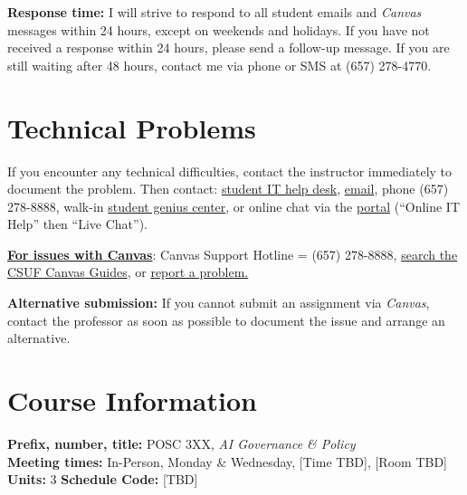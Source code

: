 \documentclass[12pt]{article}
\begin{document}
\vspace{0.5em}
\noindent \textbf{Response time:} I will strive to respond to all student emails and \emph{Canvas} messages within 24 hours, except on weekends and holidays. If you have not received a response within 24 hours, please send a follow-up message. If you are still waiting after 48 hours, contact me via phone or SMS at (657) 278-4770.

\section*{Technical Problems}

If you encounter any technical difficulties, contact the instructor immediately to document the problem. Then contact: \href{http://www.fullerton.edu/it/students/helpdesk/index.php}{student IT help desk}, \href{mailto:StudentITHelpDesk@fullerton.edu}{email}, phone (657) 278-8888, walk-in \href{http://www.fullerton.edu/it/students/sgc/index.php}{student genius center}, or online chat via the \href{http://my.fullerton.edu}{portal} (``Online IT Help'' then ``Live Chat'').

\vspace{0.5em}
\noindent \textbf{\underline{For issues with Canvas}}: Canvas Support Hotline = (657) 278-8888, \href{https://canvashelp.fullerton.edu/}{search the CSUF Canvas Guides}, or \href{https://titans.service-now.com/sp?id=sc_cat_item&sys_id=f88efe80ebea6a10fb7cfcffcad0cdc6&subject=Canvas}{report a problem.}

\vspace{0.5em}
\noindent \textbf{Alternative submission:} If you cannot submit an assignment via \emph{Canvas}, contact the professor as soon as possible to document the issue and arrange an alternative.

\section*{Course Information}
\noindent \textbf{Prefix, number, title:} POSC 3XX, \textit{AI Governance \& Policy} \\
\noindent \textbf{Meeting times:} In-Person, Monday \& Wednesday, [Time TBD], [Room TBD] \\
\noindent \textbf{Units:} 3 \quad \textbf{Schedule Code:} [TBD]
\end{document}

